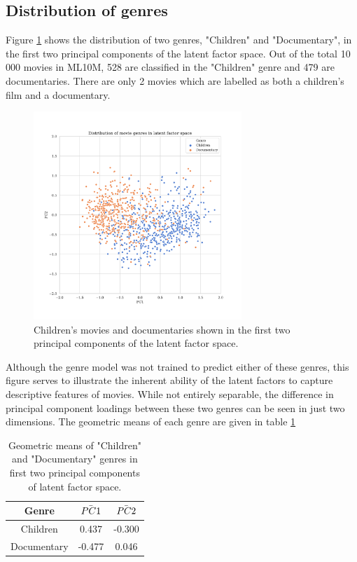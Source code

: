\subsection{Distribution of genres}
Figure \ref{fig:5-genre-pca} shows the distribution of two genres, "Children" and "Documentary", in the first two principal components of the latent factor space. Out of the total 10 000 movies in ML10M, 528 are classified in the "Children" genre and 479 are documentaries. There are only 2 movies which are labelled as both a children's film and a documentary.

\begin{figure}[H]
\centering
\includegraphics[width=0.7\textwidth]{Figures/5_ml10m-genre-pca.pdf}
\decoRule
\caption[Distribution of genres in latent factor space]{Children's movies and documentaries shown in the first two principal components of the latent factor space.}
\label{fig:5-genre-pca}
\end{figure}

Although the genre model was not trained to predict either of these genres, this figure serves to illustrate the inherent ability of the latent factors to capture descriptive features of movies. While not entirely separable, the difference in principal component loadings between these two genres can be seen in just two dimensions. The geometric means of each genre are given in table \ref{tab:ml10m-genre-pca}

\begin{table}[H]
\centering
\begin{tabular}{c | c | c}
\toprule
\textbf{Genre} & \textbf{$\Bar{PC1}$} & \textbf{$\Bar{PC2}$} \\
\midrule
Children & 0.437 & -0.300 \\
\midrule
Documentary & -0.477 & 0.046 \\
\bottomrule
\end{tabular}
\caption[Genre principal component means]{Geometric means of "Children" and "Documentary" genres in first two principal components of latent factor space.}
\label{tab:ml10m-genre-pca}
\end{table}

